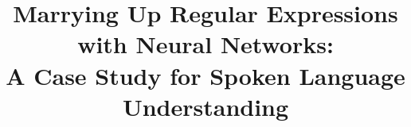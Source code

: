 \documentclass[11pt,a4paper]{article}
\title{Marrying Up Regular Expressions with Neural Networks: \\A Case Study for Spoken Language Understanding}
\author{Bingfeng Luo$^1$, Yansong Feng$^{*1}$, Zheng Wang$^2$,
	\\\textbf{Songfang Huang$^3$, Rui Yan$^1$ \and Dongyan Zhao$^1$}\\
	$^1$ICST, Peking University, China\\
	$^2$MetaLab, Lancaster University, UK \\
	$^3$IBM China Research Lab, China \\
	{\tt \{bf\_luo,fengyansong,ruiyan,zhaody\}@pku.edu.cn} \\
	{\tt z.wang@lancaster.ac.uk, huangsf@cn.ibm.com} \\}
\date{}
\begin{document}
\maketitle

















\balance
\end{document}
